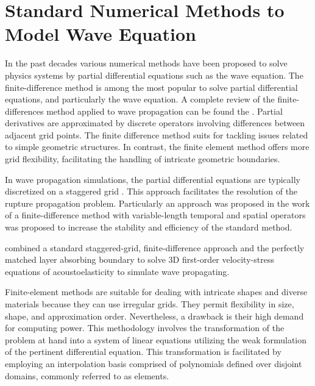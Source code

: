 \documentclass[11pt,twoside]{article}
\begin{document}
\section{Standard Numerical Methods to Model Wave Equation}\label{sec:tnm}

In the past decades various numerical methods have been proposed to solve physics systems by partial differential equations such as the 
wave equation. The finite-difference method is among the most popular to solve partial differential equations, and particularly the wave 
equation. A complete review of the finite-differences method applied to wave propagation can be found the . 
Partial derivatives are approximated by discrete operators involving differences between adjacent grid points. The finite difference 
method suits for tackling issues related to simple geometric structures. In contrast, the finite element method offers more grid 
flexibility, facilitating the handling of intricate geometric boundaries.

In wave propagation simulations, the partial differential equations are typically discretized on a staggered grid 
\citep{madariaga_dynamics_1976,Virieux1986}. This approach facilitates the resolution of the rupture propagation problem. Particularly 
an approach was proposed in the work of  a finite-difference method with variable-length temporal and spatial 
operators was proposed to increase the stability and efficiency of the standard method.

 combined a standard staggered-grid, finite-difference approach and the perfectly matched layer 
absorbing boundary to solve 3D first-order velocity-stress equations of acoustoelasticity to simulate wave propagating.

Finite-element methods are suitable for dealing with intricate shapes and diverse materials because they can use irregular grids. They 
permit flexibility in size, shape, and approximation order. Nevertheless, a drawback is their high demand for computing power. This 
methodology involves the transformation of the problem at hand into a system of linear equations utilizing the weak formulation of the 
pertinent differential equation. This transformation is facilitated by employing an interpolation basis comprised of polynomials defined 
over disjoint domains, commonly referred to as elements.
\end{document}
